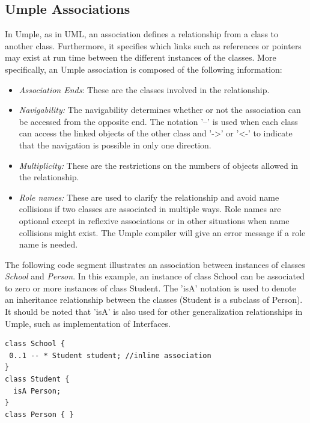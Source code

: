\subsection{Umple Associations}

In Umple, as in UML, an association defines a relationship from a class to another class. Furthermore, it specifies which links such as references or pointers may exist at run time between the different instances of the classes.
More specifically, an Umple association is composed of the following information:

\begin{itemize}
\item \textit{Association Ends}: These are the classes involved in the relationship.
\item \textit{Navigability:} The navigability determines whether or not the association can be accessed from the opposite end. The notation '--' is used when each class can access the linked objects of the other class and '-\textgreater{}' or '\textless{}-' to indicate that the navigation is possible in only one direction.
\item \textit{Multiplicity:} These are the restrictions on the numbers of objects allowed in the relationship.
\item \textit{Role names:} These are used to clarify the relationship and avoid name collisions if two classes are associated in multiple ways. Role names are optional except in reflexive associations or in other situations when name collisions might exist. The Umple compiler will give an error message if a role name is needed.
\end{itemize}

The following code segment illustrates an association between instances of classes \emph{School} and \emph{Person}. In this example, an instance of class School can be associated to zero or more instances of class Student. The 'isA' notation is used to denote an inheritance relationship between the classes (Student is a subclass of Person). It should be noted that 'isA' is also used for other generalization relationships in Umple, such as implementation of Interfaces.

\begin{lstlisting}[style=umplePlain, caption=An example of an inline Umple Association]
class School {
 0..1 -- * Student student; //inline association
}
class Student {
  isA Person;
}
class Person { }
\end{lstlisting}

